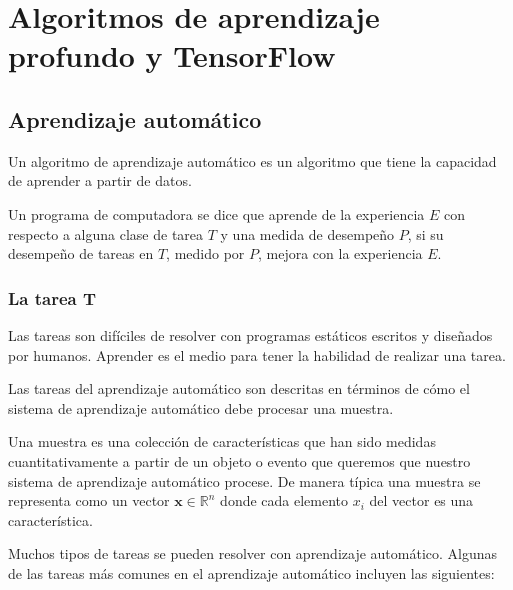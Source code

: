 

\section{Algoritmos de aprendizaje profundo y TensorFlow}
\subsection{Aprendizaje automático}\label{aprendizaje-automuxe1tico}

\begin{remark}
Un algoritmo de
aprendizaje automático es un algoritmo que tiene la capacidad de
aprender a partir de datos.
\end{remark}

\begin{remark}
Un programa de computadora se dice que aprende de la experiencia $E$ con
respecto a alguna clase de tarea $T$ y una medida de desempeño $P$, si su
desempeño de tareas en $T$, medido por $P$, mejora con la experiencia $E$.
\end{remark}


\subsubsection{La tarea T}\label{la-tarea-t}

Las tareas son difíciles de resolver con programas estáticos escritos y
diseñados por humanos.
Aprender es el medio para tener la habilidad de realizar una tarea.

Las tareas del aprendizaje automático son descritas en términos de cómo
el sistema de aprendizaje automático debe procesar una muestra.\\

\begin{remark}
Una muestra es una colección de características que han sido medidas
cuantitativamente a partir de un objeto o evento que queremos que
nuestro sistema de aprendizaje automático procese. De manera típica una
muestra se representa como un vector $\mathbf{x} \in \mathbb{R}^{n}$ donde cada elemento
$x_i$ del vector es una característica.
\end{remark}

Muchos tipos de tareas se pueden resolver con aprendizaje automático.
Algunas de las tareas más comunes en el aprendizaje automático incluyen
las siguientes:

